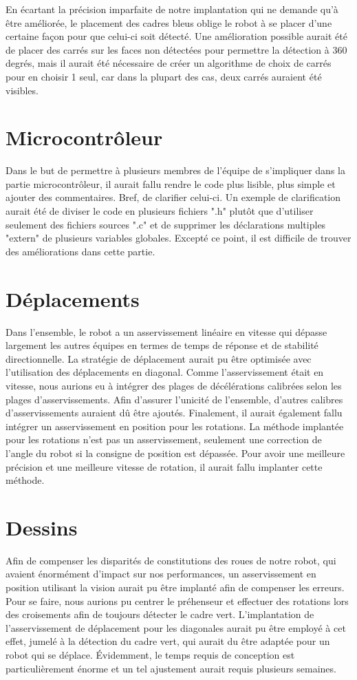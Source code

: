 En écartant la précision imparfaite de notre implantation qui ne demande qu'à être améliorée, le placement des cadres bleus oblige le robot à se placer d'une certaine façon pour que celui-ci soit détecté. Une amélioration possible aurait été de placer des carrés sur les faces non détectées pour permettre la détection à 360 degrés, mais il aurait été nécessaire de créer un algorithme de choix de carrés pour en choisir 1 seul, car dans la plupart des cas, deux carrés auraient été visibles.

\section{Microcontrôleur}
Dans le but de permettre à plusieurs membres de l'équipe de s'impliquer dans la partie microcontrôleur, il aurait fallu rendre le code plus lisible, plus simple et ajouter des commentaires. Bref, de clarifier celui-ci. Un exemple de clarification aurait été de diviser le code en plusieurs fichiers ".h" plutôt que d'utiliser seulement des fichiers sources ".c" et de supprimer les déclarations multiples "extern" de plusieurs variables globales. Excepté ce point, il est difficile de trouver des améliorations dans cette partie.

\section{Déplacements}

Dans l'ensemble, le robot a un asservissement linéaire en vitesse qui dépasse largement les autres équipes en termes de temps de réponse et de stabilité directionnelle. La stratégie de déplacement aurait pu être optimisée avec l'utilisation des déplacements en diagonal. Comme l'asservissement était en vitesse, nous aurions eu à intégrer des plages de décélérations calibrées selon les plages d'asservissements. Afin d'assurer l'unicité de l'ensemble, d'autres calibres d'asservissements auraient dû être ajoutés. Finalement, il aurait également fallu intégrer un asservissement en position pour les rotations. La méthode implantée pour les rotations n'est pas un asservissement, seulement une correction de l'angle du robot si la consigne de position est dépassée. Pour avoir une meilleure précision et une meilleure vitesse de rotation, il aurait fallu implanter cette méthode.

\section{Dessins}

Afin de compenser les disparités de constitutions des roues de notre robot, qui avaient énormément d'impact sur nos performances, un asservissement en position utilisant la vision aurait pu être implanté afin de compenser les erreurs. Pour se faire, nous aurions pu centrer le préhenseur et effectuer des rotations lors des croisements afin de toujours détecter le cadre vert. L'implantation de l'asservissement de déplacement pour les diagonales aurait pu être employé à cet effet, jumelé à la détection du cadre vert, qui aurait du être adaptée pour un robot qui se déplace. Évidemment, le temps requis de conception est particulièrement énorme et un tel ajustement aurait requis plusieurs semaines. 

